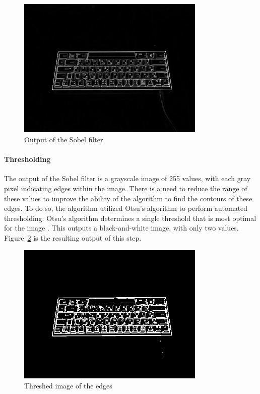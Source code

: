 \documentclass{report}
\begin{document}
\begin{figure}[H]
	\centering
	\includegraphics[width=0.8\textwidth]{sobel.png}
	\caption{Output of the Sobel filter}
	\centering
	\label{fig:metho-algo-sobel}
\end{figure}

\paragraph{Thresholding}
The output of the Sobel filter is a grayscale image of 255 values, with each
gray pixel indicating edges within the image. There is a need to reduce the
range of these values to improve the ability of the algorithm to find the
contours of these edges. To do so, the algorithm utilized Otsu's algorithm to
perform automated thresholding. Otsu's algorithm determines a single threshold
that is most optimal for the image \parencite{otsu}. This outputs a
black-and-white image, with only two values. Figure~\ref{fig:metho-algo-thresh}
is the resulting output of this step.

\begin{figure}[H]
	\centering
	\includegraphics[width=0.8\textwidth]{threshed.png}
	\caption{Threshed image of the edges}
	\label{fig:metho-algo-thresh}
	\centering
\end{figure}
\end{document}
